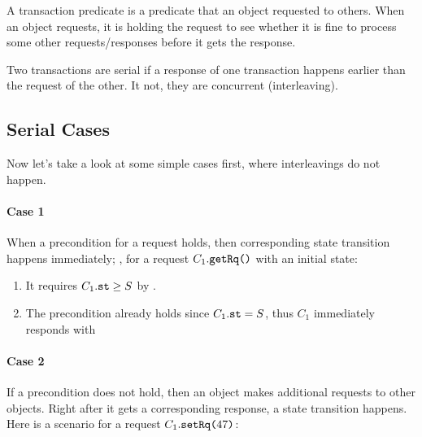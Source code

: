 \documentclass[format=manuscript]{acmart}
\begin{document}
\begin{definition}
  A transaction predicate is a predicate that an object requested to
  others. When an object requests, it is holding the request to see whether it
  is fine to process some other requests/responses before it gets the response.
\end{definition}

\begin{definition}
  Two transactions are serial if a response of one transaction happens earlier
  than the request of the other. It not, they are concurrent (interleaving).
\end{definition}

\subsection{Serial Cases}\label{serial-cases}

Now let's take a look at some simple cases first, where interleavings do not
happen.

\paragraph{Case 1}
When a precondition for a request holds, then corresponding state transition
happens immediately; \eg{}, for a request $C_1.\texttt{getRq()}$ with an initial
state:

\begin{enumerate}
\item It requires $C_1.\texttt{st} \geq S$ by .
\item The precondition already holds since $C_1.\texttt{st} = S$, thus $C_1$
  immediately responds with
\end{enumerate}

\paragraph{Case 2}
If a precondition does not hold, then an object makes additional requests to
other objects. Right after it gets a corresponding response, a state transition
happens. Here is a scenario for a request $C_1.\texttt{setRq(}47\texttt{)}$:
\end{document}
